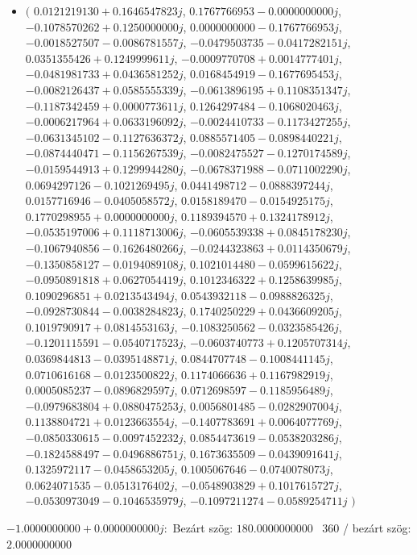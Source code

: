 \documentclass[14pt,a4paper]{article}
\begin{document}
\begin{itemize}
\item
$\big($
$0.0121219130+0.1646547823j$, $0.1767766953-0.0000000000j$, $-0.1078570262+0.1250000000j$, $0.0000000000-0.1767766953j$, $-0.0018527507-0.0086781557j$, $-0.0479503735-0.0417282151j$, $0.0351355426+0.1249999611j$, $-0.0009770708+0.0014777401j$, $-0.0481981733+0.0436581252j$, $0.0168454919-0.1677695453j$, $-0.0082126437+0.0585555339j$, $-0.0613896195+0.1108351347j$, $-0.1187342459+0.0000773611j$, $0.1264297484-0.1068020463j$, $-0.0006217964+0.0633196092j$, $-0.0024410733-0.1173427255j$, $-0.0631345102-0.1127636372j$, $0.0885571405-0.0898440221j$, $-0.0874440471-0.1156267539j$, $-0.0082475527-0.1270174589j$, $-0.0159544913+0.1299944280j$, $-0.0678371988-0.0711002290j$, $0.0694297126-0.1021269495j$, $0.0441498712-0.0888397244j$, $0.0157716946-0.0405058572j$, $0.0158189470-0.0154925175j$, $0.1770298955+0.0000000000j$, $0.1189394570+0.1324178912j$, $-0.0535197006+0.1118713006j$, $-0.0605539338+0.0845178230j$, $-0.1067940856-0.1626480266j$, $-0.0244323863+0.0114350679j$, $-0.1350858127-0.0194089108j$, $0.1021014480-0.0599615622j$, $-0.0950891818+0.0627054419j$, $0.1012346322+0.1258639985j$, $0.1090296851+0.0213543494j$, $0.0543932118-0.0988826325j$, $-0.0928730844-0.0038284823j$, $0.1740250229+0.0436609205j$, $0.1019790917+0.0814553163j$, $-0.1083250562-0.0323585426j$, $-0.1201115591-0.0540717523j$, $-0.0603740773+0.1205707314j$, $0.0369844813-0.0395148871j$, $0.0844707748-0.1008441145j$, $0.0710616168-0.0123500822j$, $0.1174066636+0.1167982919j$, $0.0005085237-0.0896829597j$, $0.0712698597-0.1185956489j$, $-0.0979683804+0.0880475253j$, $0.0056801485-0.0282907004j$, $0.1138804721+0.0123663554j$, $-0.1407783691+0.0064077769j$, $-0.0850330615-0.0097452232j$, $0.0854473619-0.0538203286j$, $-0.1824588497-0.0496886751j$, $0.1673635509-0.0439091641j$, $0.1325972117-0.0458653205j$, $0.1005067646-0.0740078073j$, $0.0624071535-0.0513176402j$, $-0.0548903829+0.1017615727j$, $-0.0530973049-0.1046535979j$, $-0.1097211274-0.0589254711j$
$\big)$
\end{itemize}
$-1.0000000000+0.0000000000j$:\
Bezárt szög: $180.0000000000$ \
360 / bezárt szög: $2.0000000000$\
\end{document}
